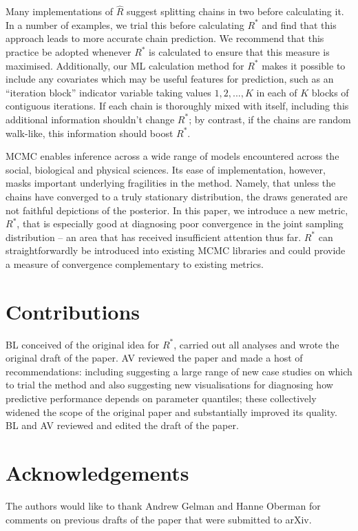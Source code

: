 \documentclass{article}
\begin{document}
Many implementations of $\widehat{R}$ suggest splitting chains in two before calculating it. In a number of examples, we trial this before calculating $R^*$ and find that this approach leads to more accurate chain prediction. We recommend that this practice be adopted whenever $R^*$ is calculated to ensure that this measure is maximised. Additionally, our ML calculation method for $R^*$ makes it possible to include any covariates which may be useful features for prediction, such as an ``iteration block'' indicator variable taking values $1, 2, ..., K$ in each of $K$ blocks of contiguous iterations. If each chain is thoroughly mixed with itself, including this additional information shouldn't change $R^*$; by contrast, if the chains are random walk-like, this information should boost $R^*$.

MCMC enables inference across a wide range of models encountered across the social, biological and physical sciences. Its ease of implementation, however, masks important underlying fragilities in the method. Namely, that unless the chains have converged to a truly stationary distribution, the draws generated are not faithful depictions of the posterior. In this paper, we introduce a new metric, $R^*$, that is especially good at diagnosing poor convergence in the joint sampling distribution -- an area that has received insufficient attention thus far. $R^*$ can straightforwardly be introduced into existing MCMC libraries and could provide a measure of convergence complementary to existing metrics.


\section{Contributions}
BL conceived of the original idea for $R^*$, carried out all analyses and wrote the original draft of the paper. AV reviewed the paper and made a host of recommendations: including suggesting a large range of new case studies on which to trial the method and also suggesting new visualisations for diagnosing how predictive performance depends on parameter quantiles; these collectively widened the scope of the original paper and substantially improved its quality. BL and AV reviewed and edited the draft of the paper.

\section{Acknowledgements}
The authors would like to thank Andrew Gelman and Hanne Oberman for comments on previous drafts of the paper that were submitted to arXiv.


 


	
\end{document}
